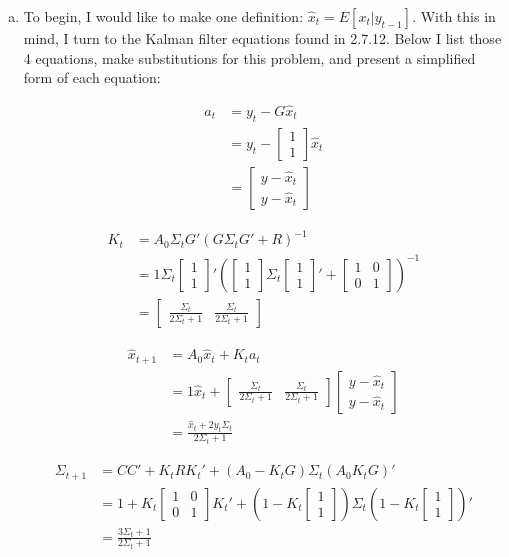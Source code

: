 \documentclass{homework}
\newcommand{\bmtwo}[2]{
   \ensuremath{ \begin{bmatrix} #1 \\ #2 \end{bmatrix}}
  }
\begin{document}
\begin{homeworkProblem}
{    \begin{enumerate}[a.]
      \item To begin, I would like to make one definition: $\hat{x}_t  = E \left[ x_t |y_{t-1} \right]$. With this in mind, I turn to the Kalman filter equations found in 2.7.12. Below I list those 4 equations, make substitutions for this problem, and present a simplified form of each equation:

        \begin{align*}
         a_t  &= y_t - G \hat{x}_t \\
          &= y_t - \bmtwo{1}{1} \hat{x}_t \\
          &= \begin{bmatrix} y - \hat{x}_t \\ y - \hat{x}_t \end{bmatrix}
        \end{align*}

        \begin{align*}
          K_t &= A_0 \Sigma_t G'(G \Sigma_t G' + R)^{-1} \\
          &= 1 \Sigma_t \bmtwo{1}{1}' \left(\bmtwo{1}{1} \Sigma_t \bmtwo{1}{1}' + \bmtwo{1 & 0}{0 & 1} \right)^{-1} \\
          &= \begin{bmatrix} \frac{\Sigma_t }{2 \Sigma_t +1} & \frac{\Sigma_t }{2 \Sigma_t +1} \end{bmatrix}
        \end{align*}

        \begin{align*}
          \hat{x}_{t+1} &= A_0 \hat{x}_t + K_t a_t\\
            &= 1 \hat{x}_t + \begin{bmatrix} \frac{\Sigma_t }{2 \Sigma_t +1} & \frac{\Sigma_t }{2 \Sigma_t +1} \end{bmatrix} \begin{bmatrix} y - \hat{x}_t \\ y - \hat{x}_t \end{bmatrix} \\
            &= \frac{\hat{x}_t + 2 y_t \Sigma_t }{2 \Sigma_t +1}
        \end{align*}

        \begin{align*}
          \Sigma_{t+1} &= CC' + K_tRK_t' + (A_0 - K_tG) \Sigma_t (A_0 K_t G)' \\
            &= 1 + K_t \bmtwo{1&0}{0&1} K_t' + \left( 1 - K_t \bmtwo{1}{1} \right) \Sigma_t \left( 1 - K_t \bmtwo{1}{1} \right)' \\
            &= \frac{3 \Sigma_t +1}{2 \Sigma_t +1}
        \end{align*}


\end{enumerate}}
\end{homeworkProblem}
\end{document}
